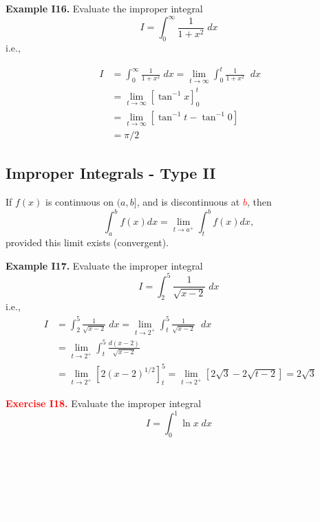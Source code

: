 \documentclass{article}
\begin{document}
\textbf{Example I16.} Evaluate  the improper integral
$$
I=\int_0^{\infty} \frac{1}{1+x^2} \;   dx
$$
i.e.,
\vspace{-1cm}

\begin{eqnarray}
& I & =\int_{0}^{\infty} \frac{1}{1+x^2} \;   dx=
\lim_{t \to \infty} \int_{0}^t \frac{1}{1+x^2}\; \;  d x  \; \;  \nonumber\\
&   & = \lim_{t \to \infty}  \left[ \tan^{-1} x \right]_0^t \nonumber\\
&   & = \lim_{t \to \infty}  \left[ \tan^{-1} t - \tan^{-1}0\right]\nonumber\\
&   & = \pi/2  \nonumber
\end{eqnarray}


\subsection{Improper Integrals - Type II}

If $f(x)$  is continuous on $(a,b]$, and is discontinuous
at \textcolor{red}{$b$}, then
$$
\int_a^{b} f(x) dx = \lim_{t \to a^+} \int_t^{b} f(x) dx,
$$
provided this limit exists (convergent).

\hrulefill

\textbf{Example I17.}  Evaluate  the improper integral
$$
I=\int_2^{5} \frac{1}{\sqrt{x-2} } \;   dx
$$
i.e.,
\begin{eqnarray}
& I & =\int_{2}^{5} \frac{1}{\sqrt{x-2}} \;   dx=
\lim_{t \to 2^+} \int_{t}^5 \frac{1}{\sqrt{x-2}}\; \;  d x  \; \;  \nonumber\\
& & = \lim_{t \to 2^+} \int_{t}^5 \frac{d (x-2)}{\sqrt{x-2}} \; \;  \nonumber\\
& & = \lim_{t \to 2^+} \left[ 2  (x-2)^{1/2} \right]_t^5 = \lim_{t \to 2^+} \left[ 2 \sqrt{3}-2 \sqrt{t-2} \right] = 2 \sqrt{3} \; \; \nonumber
\end{eqnarray}


\textcolor{red}{\textbf{Exercise I18.}} Evaluate  the improper integral
$$
I=\int_0^{1} \ln x  \;   dx
$$
\begin{eqnarray}
&  & \textcolor{white}{=\int_{0}^{1} \ln x   \;   dx = \lim_{t \to 0^+} \int_{t}^1 \ln x  \; \;  d x  \; \; (\mbox{ integration by parts} )  }\nonumber\\
&   & \textcolor{white}{= \lim_{t \to 0^+} \left[ 1 \ln 1 -t\ln t - (1-t) \right]  }  \; \;  \nonumber\\
&   & \textcolor{white}{= 0 -0 -1 +0 =-1 }   \; \;  \nonumber \\
& & 
\textcolor{white}{\left[ \mbox{Put } t=e^{-x}, t \to 0 \mbox{ as } x \to \infty, \quad t \ln t = e^{-x}(-x) \to 0\right]} \nonumber
\end{eqnarray}
\end{document}

